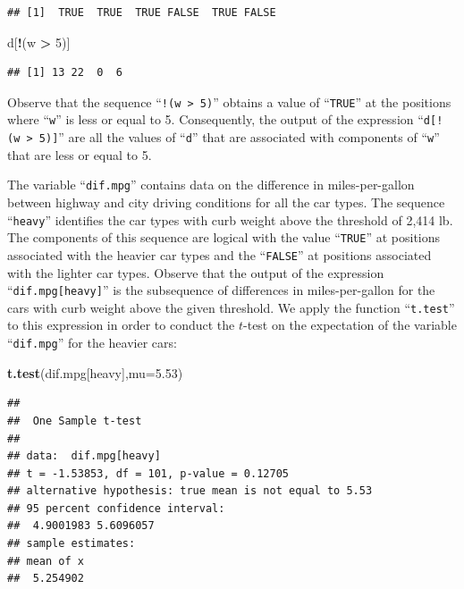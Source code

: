 \documentclass[]{krantz}
\makeatletter
\newenvironment{Shaded}{\begin{snugshade}}{\end{snugshade}}
\newcommand{\DataTypeTok}[1]{\textcolor[rgb]{0.13,0.29,0.53}{#1}}
\newcommand{\DecValTok}[1]{\textcolor[rgb]{0.00,0.00,0.81}{#1}}
\newcommand{\FloatTok}[1]{\textcolor[rgb]{0.00,0.00,0.81}{#1}}
\newcommand{\KeywordTok}[1]{\textcolor[rgb]{0.13,0.29,0.53}{\textbf{#1}}}
\newcommand{\NormalTok}[1]{#1}
\newcommand{\OperatorTok}[1]{\textcolor[rgb]{0.81,0.36,0.00}{\textbf{#1}}}
\newcommand{\StringTok}[1]{\textcolor[rgb]{0.31,0.60,0.02}{#1}}
\newenvironment{kframe}{%
\medskip{}
\setlength{\fboxsep}{.8em}
 \def\at@end@of@kframe{}%
 \ifinner\ifhmode%
  \def\at@end@of@kframe{\end{minipage}}%
  \begin{minipage}{\columnwidth}%
 \fi\fi%
 \def\FrameCommand##1{\hskip\@totalleftmargin \hskip-\fboxsep
 \colorbox{shadecolor}{##1}\hskip-\fboxsep
     \hskip-\linewidth \hskip-\@totalleftmargin \hskip\columnwidth}%
 \MakeFramed {\advance\hsize-\width
   \@totalleftmargin\z@ \linewidth\hsize
   \@setminipage}}%
 {\par\unskip\endMakeFramed%
 \at@end@of@kframe}
\renewenvironment{Shaded}{\begin{kframe}}{\end{kframe}}
\theoremstyle{definition}
\theoremstyle{definition}
\theoremstyle{definition}
\theoremstyle{remark}
\makeatother
\begin{document}
\begin{verbatim}
## [1]  TRUE  TRUE  TRUE FALSE  TRUE FALSE
\end{verbatim}

\begin{Shaded}
\begin{Highlighting}[]
\NormalTok{d[}\OperatorTok{!}\NormalTok{(w }\OperatorTok{>}\StringTok{ }\DecValTok{5}\NormalTok{)]}
\end{Highlighting}
\end{Shaded}

\begin{verbatim}
## [1] 13 22  0  6
\end{verbatim}

Observe that the sequence ``\texttt{!(w\ \textgreater{}\ 5)}'' obtains a value of ``\texttt{TRUE}'' at
the positions where ``\texttt{w}'' is less or equal to 5. Consequently, the
output of the expression ``\texttt{d{[}!(w\ \textgreater{}\ 5){]}}'' are all the values of ``\texttt{d}''
that are associated with components of ``\texttt{w}'' that are less or equal to
5.

The variable ``\texttt{dif.mpg}'' contains data on the difference in
miles-per-gallon between highway and city driving conditions for all the
car types. The sequence ``\texttt{heavy}'' identifies the car types with curb
weight above the threshold of 2,414 lb. The components of this sequence
are logical with the value ``\texttt{TRUE}'' at positions associated with the
heavier car types and the ``\texttt{FALSE}'' at positions associated with the
lighter car types. Observe that the output of the expression
``\texttt{dif.mpg{[}heavy{]}}'' is the subsequence of differences in miles-per-gallon
for the cars with curb weight above the given threshold. We apply the
function ``\texttt{t.test}'' to this expression in order to conduct the \(t\)-test
on the expectation of the variable ``\texttt{dif.mpg}'' for the heavier cars:

\begin{Shaded}
\begin{Highlighting}[]
\KeywordTok{t.test}\NormalTok{(dif.mpg[heavy],}\DataTypeTok{mu=}\FloatTok{5.53}\NormalTok{)}
\end{Highlighting}
\end{Shaded}

\begin{verbatim}
## 
##  One Sample t-test
## 
## data:  dif.mpg[heavy]
## t = -1.53853, df = 101, p-value = 0.12705
## alternative hypothesis: true mean is not equal to 5.53
## 95 percent confidence interval:
##  4.9001983 5.6096057
## sample estimates:
## mean of x 
##  5.254902
\end{verbatim}
\end{document}
